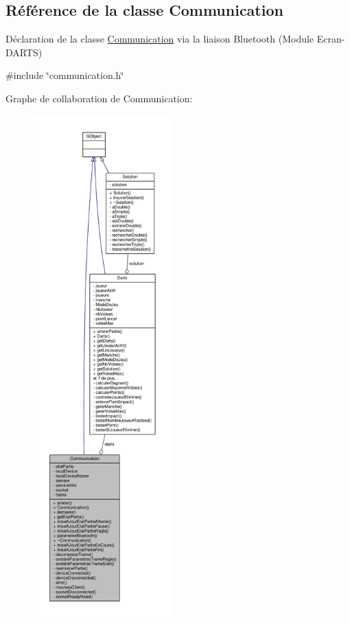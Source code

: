 \hypertarget{class_communication}{}\subsection{Référence de la classe Communication}
\label{class_communication}


Déclaration de la classe \hyperlink{class_communication}{Communication} via la liaison Bluetooth (Module Ecran-\/\+D\+A\+R\+TS)  




{\ttfamily \#include \char`\"{}communication.\+h\char`\"{}}



Graphe de collaboration de Communication\+:
\nopagebreak
\begin{figure}[H]
\begin{center}
\leavevmode
\includegraphics[height=550pt]{class_communication__coll__graph}
\end{center}
\end{figure}
